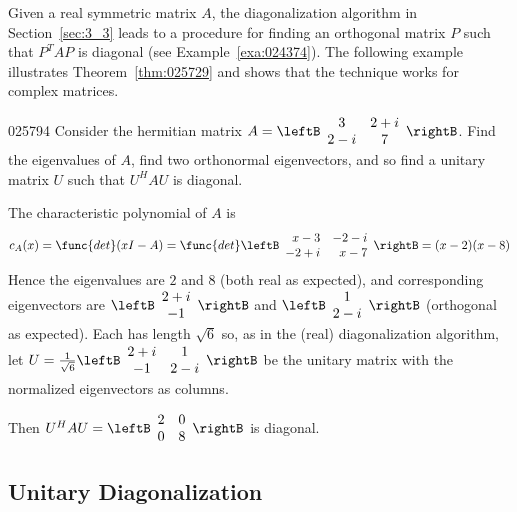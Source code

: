 Given a real symmetric matrix $A$, the diagonalization algorithm in Section~\ref{sec:3_3} leads to a procedure for finding an orthogonal matrix $P$ such that $P^{T}AP$ is diagonal (see Example~\ref{exa:024374}). The following example illustrates Theorem~\ref{thm:025729} and shows that the technique works for complex matrices.


\begin{example}{}{025794}
Consider the hermitian matrix $A = \leftB \begin{array}{cc}
3 & 2 + i \\
2 - i & 7
\end{array}\rightB$. Find the eigenvalues of $A$, find two orthonormal eigenvectors, and so find a unitary matrix $U$ such that $U^{H}AU$ is diagonal.


\begin{solution}
  The characteristic polynomial of $A$ is
\begin{equation*}
c_{A}(x) = \func{det}(xI - A) = \func{det}\leftB \begin{array}{rr}
x - 3 & -2 - i \\
-2 + i & x - 7
\end{array}\rightB = (x-2)(x-8)
\end{equation*}
Hence the eigenvalues are $2$ and $8$ (both real as expected), and corresponding eigenvectors are $\leftB \begin{array}{cc}
2 + i \\
-1
\end{array}\rightB$ and $\leftB \begin{array}{cc}
1 \\
2 - i
\end{array}\rightB$ (orthogonal as expected). Each has length $\sqrt{6}$
 so, as in the (real) diagonalization algorithm, let $U = \frac{1}{\sqrt{6}}\leftB \begin{array}{cc}
 2 + i & 1 \\
 -1 & 2 - i
 \end{array}\rightB$ be the unitary matrix with the normalized eigenvectors as columns.

Then $U^HAU = \leftB \begin{array}{rr}
2 & 0 \\
0 & 8
\end{array}\rightB$ is diagonal.
\end{solution}
\end{example}

\subsection*{Unitary Diagonalization}

